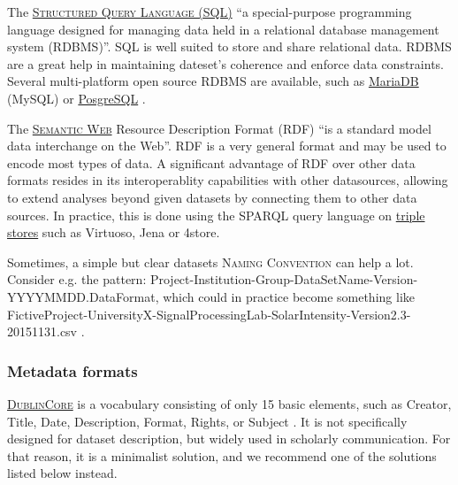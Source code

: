 \noindent The  \textsc{\href{https://en.wikipedia.org/wiki/SQL}{Structured Query Language (SQL)}} ``a special-purpose programming language designed for managing data held in a relational database management system (RDBMS)''\cite{wikipedia_sql_2015}. SQL is well suited to store and share relational data. RDBMS are a great help in maintaining dateset's coherence and enforce data constraints. Several multi-platform open source RDBMS are available, such as \href{https://mariadb.org/}{MariaDB} (MySQL) \cite{mariadb_mariadb_2015} or \href{http://www.postgresql.org/}{PosgreSQL} \cite{postgresql_postgresql:_2015}.

\vspace{0.4cm}

\noindent The  \textsc{\href{http://www.w3.org/RDF/}{Semantic Web}} Resource Description Format (RDF) ``is a standard model data interchange on the Web''\cite{w3c_rdf_2014}. RDF is a very general format and may be used to encode most types of data. A significant advantage of RDF over other data formats resides in its interoperablity capabilities with other datasources, allowing to extend analyses beyond given datasets by connecting them to other data sources. In practice, this is done using the SPARQL query language on \href{http://www.w3.org/wiki/LargeTripleStores}{triple stores} such as Virtuoso, Jena or 4store.

\vspace{0.4cm}

\noindent Sometimes, a simple but clear datasets   \textsc{Naming Convention} can help a lot. Consider e.g. the pattern: Project-Institution-Group-DataSetName-Version-YYYYMMDD.DataFormat, which could in practice become something like FictiveProject-UniversityX-SignalProcessingLab-SolarIntensity-Version2.3-20151131.csv .


\subsubsection{Metadata formats}

\noindent {} \textsc{\href{http://dublincore.org/documents/dces/}{DublinCore}} is a vocabulary consisting of only 15 basic elements, such as Creator, Title, Date, Description, Format, Rights, or Subject \cite{dublincore_dublin_3013}. It is not specifically designed for dataset description, but widely used in scholarly communication. For that reason, it is a minimalist solution, and we recommend one of the solutions listed below instead. 

